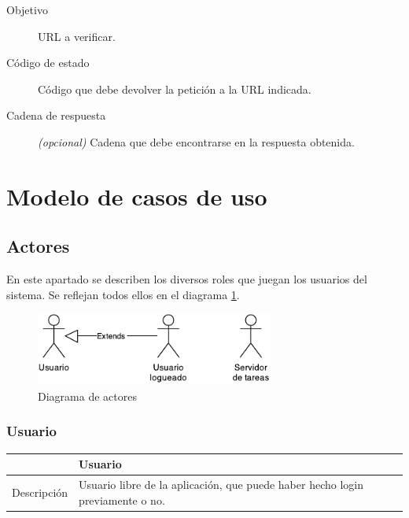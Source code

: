 \begin{description}
\item[Objetivo] URL a verificar.
\item[Código de estado] Código que debe devolver la petición a la URL indicada.
\item[Cadena de respuesta] \textit{(opcional)} Cadena que debe encontrarse en la
  respuesta obtenida.
\end{description}



\section{Modelo de casos de uso}

\subsection{Actores}

En este apartado se describen los diversos roles que juegan los usuarios del
sistema. Se reflejan todos ellos en el diagrama \ref{fig:actores}.

\begin{figure}[h]
  \centering
  \includegraphics[width=0.7\textwidth]{4_analisis/diagrama_actores}
  \caption{Diagrama de actores}
  \label{fig:actores}
\end{figure}

\subsubsection{Usuario}

\begin{center}
  \begin{tabularx}{\textwidth}{|c|X|}
    \hline
     & Usuario \\

    \hline

    Descripción & Usuario libre de la aplicación, que puede haber hecho login previamente o no. \\

    \hline
  \end{tabularx}

\end{center}


